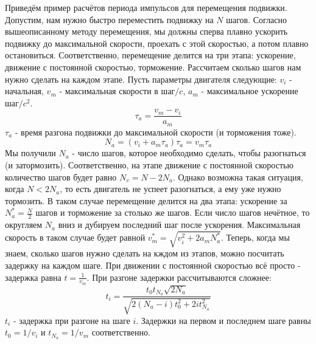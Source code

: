 \documentclass[14pt,russian,a4paper]{extarticle}
\newcounter{subsubsubsection}[subsubsection]
\begin{document}
Приведём пример расчётов периода импульсов для перемещения подвижки.
Допустим, нам нужно быстро переместить подвижку на $N$ шагов. Согласно вышеописанному методу перемещения, мы должны сперва плавно ускорить подвижку до максимальной скорости, проехать с этой скоростью, а потом плавно остановиться. Соответственно, перемещение делится на три этапа: ускорение, движение с постоянной скоростью, торможение. Рассчитаем сколько шагов нам нужно сделать на каждом этапе. Пусть параметры двигателя следующие: $v_i$ - начальная, $v_m$ - максимальная скорости в шаг$/c$, $a_m$ - максимальное ускорение шаг$/c^2$.
\newline
$$
\tau_a = \frac{v_m - v_i}{a_m}
$$
$\tau_a$ - время разгона подвижки до максимальной скорости (и торможения тоже).
$$
N_a = (v_i + a_m \tau_a) \tau_a = v_m \tau_a 
$$
Мы получили $N_a$ - число шагов, которое необходимо сделать, чтобы разогнаться (и затормозить). Соответственно, на этапе движение с постоянной скоростью количество шагов будет равно $N_v = N - 2 N_a$. Однако возможна такая ситуация, когда $N < 2 N_a$, то есть двигатель не успеет разогнаться, а ему уже нужно тормозить. В таком случае перемещение делится на два этапа: ускорение за $N_a^* = \frac{N}{2}$ шагов и торможение за столько же шагов. Если число шагов нечётное, то округляем $N_a$ вниз и дубируем последний шаг после ускорения. Максимальная скорость в таком случае будет равной $v_m^* = \sqrt{v_i^2 + 2 a_m N_a^*}$.
\newline
Теперь, когда мы знаем, сколько шагов нужно сделать на кждом из этапов, можно посчитать задержку на каждом шаге. При движении с постоянной скоростью всё просто - задержка равна $t = \frac{1}{v_m}$. При разгоне задержки рассчитываются сложнее:
$$
t_i = \frac{t_0 t_{N_a} \sqrt{2 N_a}}{\sqrt{2 (N_a - i) t_0^2 + 2 i t_{N_a}^2}}
$$
$t_i$ - задержка при разгоне на шаге $i$. Задержки на первом и последнем шаге равны $t_0 = 1/v_i$ и $t_{N_a} = 1/v_m$ соответственно.

\end{document}
